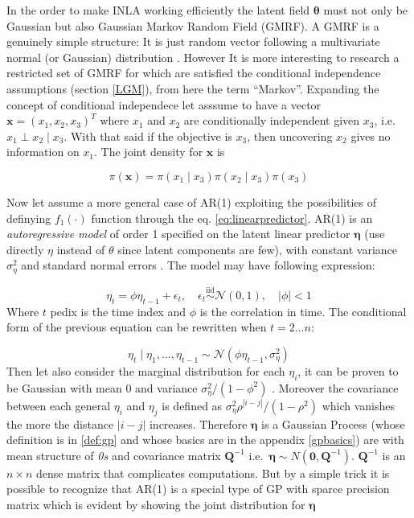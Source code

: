 \documentclass[
  12pt,
  a4paper,
  oneside]{book}
\theoremstyle{definition}
\theoremstyle{definition}
\theoremstyle{definition}
\theoremstyle{remark}
\begin{document}
In the order to make INLA working efficiently the latent field \(\boldsymbol\theta\) must not only be Gaussian but also Gaussian Markov Random Field (GMRF). A GMRF is a genuinely simple structure: It is just random vector following a multivariate normal (or Gaussian) distribution \citep{GMRFRue}. However It is more interesting to research a restricted set of GMRF for which are satisfied the conditional independence assumptions (section \ref{LGM}), from here the term ``Markov''. Expanding the concept of conditional independece let asssume to have a vector \(\boldsymbol{\mathbf{x}}=\left(x_{1}, x_{2}, x_{3}\right)^{T}\) where \(x_1\) and \(x_2\) are conditionally independent given \(x_3\), i.e.~\(x_{1} \perp x_{2} \mid x_3\). With that said if the objective is \(x_3\), then uncovering \(x_2\) gives no information on \(x_1\). The joint density for \(\boldsymbol{\mathbf{x}}\) is

\begin{equation}
  \pi(\boldsymbol{\mathbf{x}})=\pi\left(x_{1} \mid x_{3}\right) \pi\left(x_{2} \mid x_{3}\right) \pi\left(x_{3}\right)
\label{eq:pix}
\end{equation}

Now let assume a more general case of AR(1) exploiting the possibilities of definying \(f_{1}(\cdot)\) function through the eq. \eqref{eq:linearpredictor}. AR(1) is an \emph{autoregressive model} of order 1 specified on the latent linear predictor \(\boldsymbol\eta\) (use directly \(\eta\) instead of \(\theta\) since latent components are few), with constant variance \(\sigma_{\eta}^{2}\) and standard normal errors \citetext{\citeyear{GMRFRue}; \citeyear{wang2018bayesian}}. The model may have following expression:

\[
\eta_t=\phi \eta_{t-1}+\epsilon_{t}, \quad \epsilon_{t} \stackrel{\mathrm{iid}}{\sim} \mathcal{N}(0,1), \quad|\phi|<1
\]
Where \(t\) pedix is the time index and \(\phi\) is the correlation in time. The conditional form of the previous equation can be rewritten when \(t = 2 \ldots n\):

\[
\eta_{t} \mid \eta_{1}, \ldots, \eta_{t-1} \sim \mathcal{N}\left(\phi \eta_{t-1}, \sigma_{\eta}^{2}\right)
\]
Then let also consider the marginal distribution for each \(\eta_i\), it can be proven to be Gaussian with mean 0 and variance \(\sigma_{\eta}^{2} /\left(1-\phi^{2}\right)\) \citeyearpar{wang2018bayesian}. Moreover the covariance between each general \(\eta_{i}\) and \(\eta_{j}\) is defined as \(\sigma_{\eta}^{2} \rho^{|i-j|} /\left(1-\rho^{2}\right)\) which vanishes the more the distance \(|i-j|\) increases.
Therefore \(\boldsymbol\eta\) is a Gaussian Process (whose definition is in \ref{def:gp} and whose basics are in the appendix \ref{gpbasics}) are with mean structure of \emph{0s} and covariance matrix \(\boldsymbol{Q}^{-1}\) i.e.~\(\boldsymbol{\eta} \sim N(\mathbf{0}, \boldsymbol{Q}^{-1})\). \(\boldsymbol{Q}^{-1}\) is an \(n \times n\) dense matrix that complicates computations.
But by a simple trick it is possible to recognize that AR(1) is a special type of GP with sparce precision matrix which is evident by showing the joint distribution for \(\boldsymbol\eta\)
\end{document}
